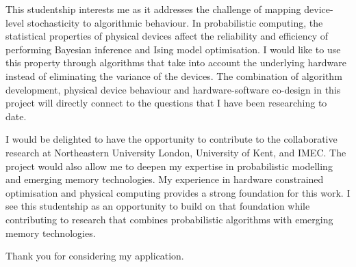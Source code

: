 This studentship interests me as it addresses the challenge of mapping device-level stochasticity to algorithmic behaviour. In probabilistic computing, the statistical properties of physical devices affect the reliability and efficiency of performing Bayesian inference and Ising model optimisation. I would like to use this property through algorithms that take into account the underlying hardware instead of eliminating the variance of the devices. The combination of algorithm development, physical device behaviour and hardware-software co-design in this project will directly connect to the questions that I have been researching to date.

I would be delighted to have the opportunity to contribute to the collaborative research at Northeastern University London, University of Kent, and IMEC. The project would also allow me to deepen my expertise in probabilistic modelling and emerging memory technologies. My experience in hardware constrained optimisation and physical computing provides a strong foundation for this work. I see this studentship as an opportunity to build on that foundation while contributing to research that combines probabilistic algorithms with emerging memory technologies.

Thank you for considering my application.